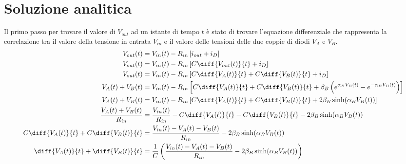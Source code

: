\chapter{Soluzione analitica}
	Il primo passo per trovare il valore di $V_{out}$ ad un istante di tempo $t$ è stato di trovare l'equazione differenziale che rappresenta la correlazione tra il valore della tensione in entrata $V_{in}$ e il valore delle tensioni delle due coppie di diodi $V_{A}$ e $V_{B}$.
	\begin{equation}
		\label{eq:differenziale}
		\begin{split}
			V_{out}(t) &= V_{in}(t)-R_{in}\left[i_{out}+i_{D}\right]\\
			V_{out}(t) &= V_{in}(t)-R_{in}\left[C\diff{V_{out}(t)}{t}+i_{D}\right]\\
			V_{out}(t) &= V_{in}(t)-R_{in}\left[C\diff{V_{A}(t)}{t}+C\diff{V_{B}(t)}{t}+i_{D}\right]\\
			V_{A}(t)+V_{B}(t) &= V_{in}(t)-R_{in}\left[C\diff{V_{A}(t)}{t}+C\diff{V_{B}(t)}{t}+\beta_{B}\left(e^{\alpha_{B}V_{B}(t)}-e^{-\alpha_{B}V_{B}(t)}\right)\right]\\
			V_{A}(t)+V_{B}(t) &= V_{in}(t)-R_{in}\left[C\diff{V_{A}(t)}{t}+C\diff{V_{B}(t)}{t}+2\beta_{B}\sinh(\alpha_{B}V_{B}(t))\right]\\
			\frac{V_{A}(t)+V_{B}(t)}{R_{in}} &= \frac{V_{in}(t)}{R_{in}}-C\diff{V_{A}(t)}{t}-C\diff{V_{B}(t)}{t}-2\beta_{B}\sinh(\alpha_{B}V_{B}(t))\\
			C\diff{V_{A}(t)}{t}+C\diff{V_{B}(t)}{t} &= \frac{V_{in}(t)-V_{A}(t)-V_{B}(t)}{R_{in}}-2\beta_{B}\sinh(\alpha_{B}V_{B}(t))\\
			\diff{V_{A}(t)}{t}+\diff{V_{B}(t)}{t} &= \frac{1}{C}\left(\frac{V_{in}(t)-V_{A}(t)-V_{B}(t)}{R_{in}}-2\beta_{B}\sinh(\alpha_{B}V_{B}(t))\right)\\
		\end{split}
	\end{equation}
	\pagebreak
	
